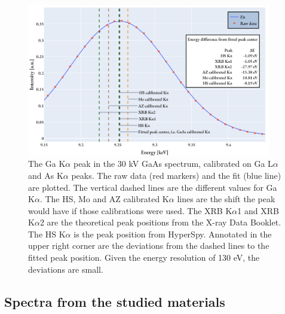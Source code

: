 \begin{figure}[p]
    \centering
    \includegraphics[width=0.95\textwidth]{figures/Ga-K.png}
    \caption{
        The Ga K$\alpha$ peak in the 30 kV GaAs spectrum, calibrated on Ga L$\alpha$ and As K$\alpha$ peaks.
        The raw data (red markers) and the fit (blue line) are plotted.
        The vertical dashed lines are the different values for Ga K$\alpha$.
        The HS, Mo and AZ calibrated K$\alpha$ lines are the shift the peak would have if those calibrations were used.
        The XRB K$\alpha$1 and XRB K$\alpha$2 are the theoretical peak positions from the X-ray Data Booklet.
        The HS K$\alpha$ is the peak position from HyperSpy.
        Annotated in the upper right corner are the deviations from the dashed lines to the fitted peak position.
        Given the energy resolution of 130 eV, the deviations are small.
    }
    \label{fig:results:Ga-K}
\end{figure}


\clearpage

\subsection{Spectra from the studied materials}
\label{sec:results:qualitative:each_sample_area}

